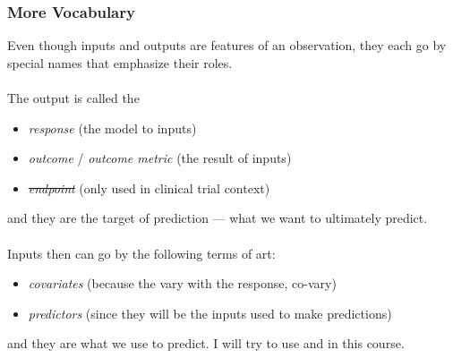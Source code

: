 \documentclass[slides]{beamer} %
\begin{document}
\begin{frame}\frametitle{More Vocabulary}

\small
Even though inputs and outputs are features of an observation, they each go by special names that emphasize their roles. \\~\\

The output is called the

\begin{itemize}
\item \textit{response} (the model  to inputs)
\item \textit{outcome} / \textit{outcome metric} (the result of inputs)
\item \sout{\textit{endpoint}} (only used in clinical trial context)
\end{itemize}

and they are the target of prediction --- what we want to ultimately predict. \\~\\

Inputs then can go by the following terms of art:

\begin{itemize}
\item \textit{covariates} (because the vary with the response, co-vary)
\item \textit{predictors} (since they will be the inputs used to make predictions)
\end{itemize}

and they are what we use to predict. I will try to use  and  in this course.

\end{frame}
\end{document}
